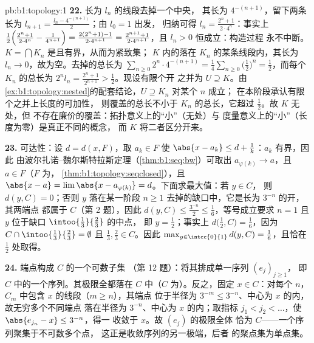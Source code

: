 \begin{solution}{pb:b1:topology:1}
\textbf{22.} 长为 $l_n$ 的线段去掉一个中央，
其长为 $4^{-(n+1)}$，留下两条长为 $l_{n+1}
= \frac{l_n - 4^{-(n+1)}}{2}$；由 $l_0 = 1$ 出发，
归纳可得 $l_n = \frac{2^n + 1}{2\cdot4^n}$：事实上
$\frac12\Bigl(\frac{2^n+1}{2\cdot4^n} - \frac{1}{4^{n+1}}\Bigr)
= \frac{2(2^n + 1) - 1}{2\cdot4^{n+1}} = \frac{2^{n+1} +
1}{2\cdot4^{n+1}}$，且 $l_n > 0$ 恒成立：构造过程
永不中断。$K = \bigcap K_n$ 是且有界，从而为紧致集；
$K$ 内的落在 $K_n$ 的某条线段内，其长为
$l_n \to 0$，故为空。去掉的总长为 $\sum_{n\geq0} 2^n
\cdot 4^{-(n+1)} = \frac14\sum_{n\geq0}\bigl(\frac12\bigr)^n =
\frac12$，而每个 $K_n$ 的总长为 $2^n l_n = \frac{2^n +
1}{2^{n+1}} > \frac12$。现设有限个开
之并为 $U \supseteq K$。由
\cref{ex:b1:topology:nested}的配套结论，$U \supseteq K_n$ 对某个 $n$ 成立；
在本阶段承认有限个之并上长度的可加性，
则覆盖的总长不小于
$K_n$ 的总长，它超过 $\frac12$。故 $K$ 无处，但
不存在廉价的覆盖：拓扑意义上的“小”（无处）与
度量意义上的“小”（长度为零）是真正不同的概念，
而 $K$ 将二者区分开来。

\textbf{23.} 可达性：设 $d = d(x, F)$，取 $a_k \in F$
使 $\abs{x - a_k} \leq d + \frac1k$：$a_k$ 有界，因此
由波尔扎诺--魏尔斯特拉斯定理（\cref{thm:b1:seq:bw}）可取出
$a_{\varphi(k)} \to a$，且 $a \in F$（$F$ 为，
\cref{thm:b1:topology:seqclosed}），且 $\abs{x - a} = \lim
\abs{x - a_{\varphi(k)}} = d$。下面求最大值：若 $y \in C$，
则 $d(y, C) = 0$；否则 $y$ 落在某一阶段
$n \geq 1$ 去掉的缺口中，它是长为 $3^{-n}$ 的开，其两端点
都属于 $C$（第 2 题），因此 $d(y, C) \leq
\frac{3^{-n}}{2} \leq \frac16$，等号成立要求 $n = 1$
且 $y$ 位于缺口 $\intoo{\frac13}{\frac23}$ 的中点，
即 $y = \frac12$；事实上 $d\bigl(\frac12, C\bigr) =
\frac16$，因为 $C \cap \intoo{\frac13}{\frac23} = \emptyset$ 且
$\frac13, \frac23 \in C$。因此 $\max_{y\in\intcc{0}{1}} d(y, C)
= \frac16$，且恰在 $\frac12$ 处取得。

\textbf{24.} 端点构成 $C$ 的一个可数子集
（第 12 题）：将其排成单一序列 $(e_j)_{j\geq1}$，
即 $C$ 中的一个序列。其极限全都落在 $C$ 中（$C$
为）。反之，固定 $x \in C$：对每个 $n$，
$C_m$ 中包含 $x$ 的线段（$m \geq n$），其端点
位于半径为 $3^{-m} \leq 3^{-n}$、中心为 $x$ 的内，故无穷多个不同端点
落在半径为 $3^{-n}$、中心为 $x$ 的内；取指标 $j_1 < j_2
< \dots$，使 $\abs{e_{j_n} - x} \leq 3^{-n}$，得一
收敛于 $x$。故 $(e_j)$ 的极限全体
恰为 $C$——一个序列聚集于不可数多个点，
这正是收敛序列的另一极端，后者
的聚点集为单点集。


\end{solution}
